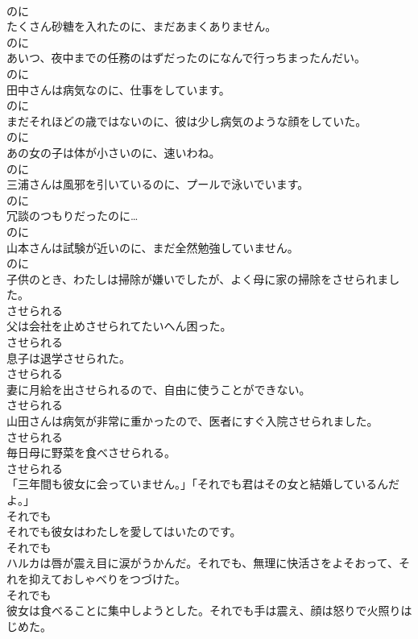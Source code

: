 \documentclass[8pt]{extreport}
\begin{document}
\begin{CJK}{UTF8}{min}
\\	のに
\\	たくさん砂糖を入れたのに、まだあまくありません。	
\\	のに
\\	あいつ、夜中までの任務のはずだったのになんで行っちまったんだい。	
\\	のに
\\	田中さんは病気なのに、仕事をしています。	
\\	のに
\\	まだそれほどの歳ではないのに、彼は少し病気のような顔をしていた。	
\\	のに
\\	あの女の子は体が小さいのに、速いわね。	
\\	のに
\\	三浦さんは風邪を引いているのに、プールで泳いでいます。	
\\	のに
\\	冗談のつもりだったのに…	
\\	のに
\\	山本さんは試験が近いのに、まだ全然勉強していません。	
\\	のに
\\	子供のとき、わたしは掃除が嫌いでしたが、よく母に家の掃除をさせられました。	
\\	させられる
\\	父は会社を止めさせられてたいへん困った。	
\\	させられる
\\	息子は退学させられた。	
\\	させられる
\\	妻に月給を出させられるので、自由に使うことができない。	
\\	させられる
\\	山田さんは病気が非常に重かったので、医者にすぐ入院させられました。	
\\	させられる
\\	毎日母に野菜を食べさせられる。	
\\	させられる
\\	「三年間も彼女に会っていません。」「それでも君はその女と結婚しているんだよ。」	
\\	それでも
\\	それでも彼女はわたしを愛してはいたのです。	
\\	それでも
\\	ハルカは唇が震え目に涙がうかんだ。それでも、無理に快活さをよそおって、それを抑えておしゃべりをつづけた。	
\\	それでも
\\	彼女は食べることに集中しようとした。それでも手は震え、顔は怒りで火照りはじめた。	

\end{CJK}
\end{document}
